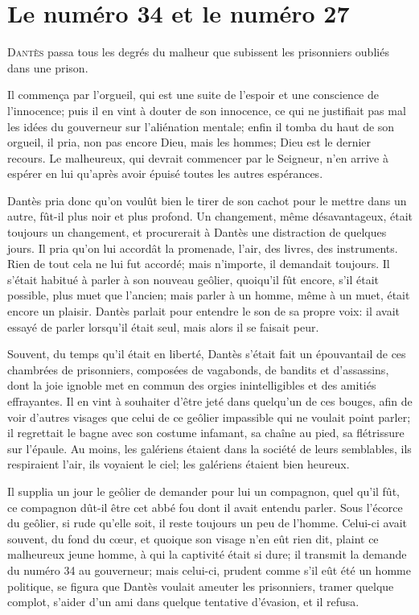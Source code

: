 \chapter{Le numéro 34 et le numéro 27}

\lettrine{D}{antès} passa tous les degrés du malheur que subissent les prisonniers oubliés dans une prison.

\zz
Il commença par l'orgueil, qui est une suite de l'espoir et une conscience de l'innocence; puis il en vint à douter de son innocence, ce qui ne justifiait pas mal les idées du gouverneur sur l'aliénation mentale; enfin il tomba du haut de son orgueil, il pria, non pas encore Dieu, mais les hommes; Dieu est le dernier recours. Le malheureux, qui devrait commencer par le Seigneur, n'en arrive à espérer en lui qu'après avoir épuisé toutes les autres espérances.

Dantès pria donc qu'on voulût bien le tirer de son cachot pour le mettre dans un autre, fût-il plus noir et plus profond. Un changement, même désavantageux, était toujours un changement, et procurerait à Dantès une distraction de quelques jours. Il pria qu'on lui accordât la promenade, l'air, des livres, des instruments. Rien de tout cela ne lui fut accordé; mais n'importe, il demandait toujours. Il s'était habitué à parler à son nouveau geôlier, quoiqu'il fût encore, s'il était possible, plus muet que l'ancien; mais parler à un homme, même à un muet, était encore un plaisir. Dantès parlait pour entendre le son de sa propre voix: il avait essayé de parler lorsqu'il était seul, mais alors il se faisait peur.

Souvent, du temps qu'il était en liberté, Dantès s'était fait un épouvantail de ces chambrées de prisonniers, composées de vagabonds, de bandits et d'assassins, dont la joie ignoble met en commun des orgies inintelligibles et des amitiés effrayantes. Il en vint à souhaiter d'être jeté dans quelqu'un de ces bouges, afin de voir d'autres visages que celui de ce geôlier impassible qui ne voulait point parler; il regrettait le bagne avec son costume infamant, sa chaîne au pied, sa flétrissure sur l'épaule. Au moins, les galériens étaient dans la société de leurs semblables, ils respiraient l'air, ils voyaient le ciel; les galériens étaient bien heureux.

Il supplia un jour le geôlier de demander pour lui un compagnon, quel qu'il fût, ce compagnon dût-il être cet abbé fou dont il avait entendu parler. Sous l'écorce du geôlier, si rude qu'elle soit, il reste toujours un peu de l'homme. Celui-ci avait souvent, du fond du cœur, et quoique son visage n'en eût rien dit, plaint ce malheureux jeune homme, à qui la captivité était si dure; il transmit la demande du numéro 34 au gouverneur; mais celui-ci, prudent comme s'il eût été un homme politique, se figura que Dantès voulait ameuter les prisonniers, tramer quelque complot, s'aider d'un ami dans quelque tentative d'évasion, et il refusa.


